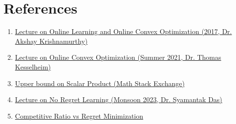 \documentclass[11pt]{article}
\begin{document}


\section*{References}
\begin{enumerate}
    \item \href{https://people.cs.umass.edu/~akshay/courses/cs690m/files/lec15.pdf}{Lecture on Online Learning and Online Convex Optimization (2017, Dr. Akshay Krishnamurthy)}
    \item \href{https://tcs.cs.uni-bonn.de/lib/exe/fetch.php?media=teaching%3Ass21%3Avl-aau%3Alecture24.pdf&authuser=0}{Lecture on Online Convex Optimization (Summer 2021, Dr. Thomas Kesselheim)}
    \item \href{https://math.stackexchange.com/questions/3663333/upper-bound-on-scalar-product}{Upper bound on Scalar Product (Math Stack Exchange)}
    \item \href{https://tcs.cs.uni-bonn.de/lib/exe/fetch.php?media=teaching%3Ass21%3Avl-aau%3Alecture19.pdf}{Lecture on No Regret Learning (Monsoon 2023, Dr. Syamantak Das)}
    \item \href{https://proceedings.mlr.press/v98/daniely19a/daniely19a.pdf}{Competitive Ratio vs Regret Minimization}
\end{enumerate}
\end{document}
